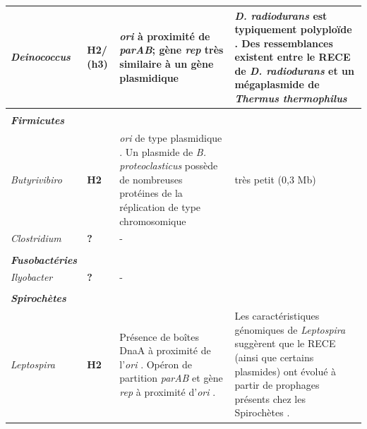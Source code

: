 \begin{longtable}{@{\hspace{-2cm}} >{\footnotesize\itshape}p{} | >{\bfseries\scriptsize}p{} | >{\scriptsize}p{} | >{\scriptsize}p{} @{\hspace{0.5cm}}}
     Deinococcus & H2/ (h3) & \textit{ori} à proximité de \textit{parAB}; gène \textit{rep} très similaire à un gène plasmidique \citep{MacLellan2004} & \textit{D. radiodurans} est typiquement polyploïde \citep{White1999}. Des ressemblances existent entre le RECE de \textit{D. radiodurans} et un mégaplasmide de \textit{Thermus thermophilus} \citep{omelchenko2005comparative} \\
     \hline
	\multicolumn{1}{@{\hspace{-2cm}}} {} \\
     \multicolumn{1}{@{\hspace{-2cm}} p{0.15\textwidth}} {\textbf{Firmicutes}}\\
     Butyrivibiro & H2 & \textit{ori} de type plasmidique \citep{Yeoman2011}. Un plasmide de \textit{B. proteoclasticus} possède de nombreuses protéines de la réplication de type chromosomique \citep{Yeoman2011} & très petit (0,3 Mb) \citep{Kelly2010} \\
     \hline
     Clostridium & ? & \centering - & \multicolumn{1}{c}{-}  \\
     \hline
	\multicolumn{1}{@{\hspace{-2cm}}} {} \\
     \multicolumn{1}{@{\hspace{-2cm}} p{0.15\textwidth}} {\textbf{Fusobactéries}}\\
     Ilyobacter & ? & \centering - & \multicolumn{1}{c}{-} \\
	\hline
	\multicolumn{1}{@{\hspace{-2cm}}} {} \\
	\multicolumn{1}{@{\hspace{-2cm}} p{0.15\textwidth}} {\textbf{Spirochètes}}\\
     Leptospira & H2 & Présence de boîtes DnaA à proximité de l'\textit{ori} \citep{ren2003unique}. Opéron de partition \textit{parAB} et gène \textit{rep} à proximité d'\textit{ori} \citep{Picardeau2008}. & Les caractéristiques génomiques  de \textit{Leptospira} suggèrent que le RECE (ainsi que certains plasmides) ont évolué à partir de prophages présents chez les Spirochètes \citep{Picardeau2008}.\\
\end{longtable}


